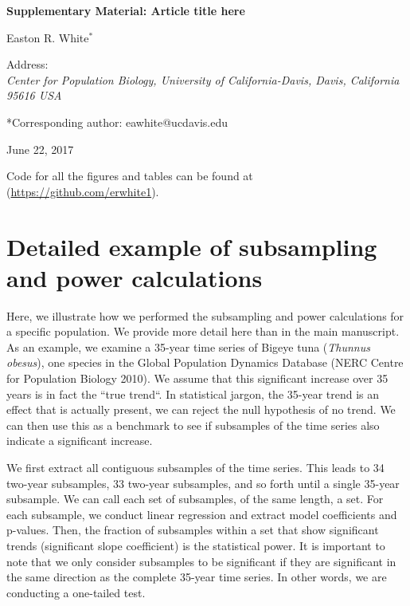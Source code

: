 \documentclass[12pt,]{article}
\title{}
\author{}
\date{}
\begin{document}
\vspace{2cm}

\begin{center}
 \textbf{Supplementary Material: Article title here}
 
Easton R. White$^{*}$
\vspace{3 mm}

Address: \\ \emph{Center for Population Biology, University of California-Davis, Davis, California 95616 USA}

*Corresponding author: eawhite@ucdavis.edu

June 22, 2017
 \end{center}

\vspace{2cm}

\tableofcontents

\vspace{1cm}

Code for all the figures and tables can be found at
(\url{https://github.com/erwhite1}).

\vspace{2cm}

\clearpage

\section{Detailed example of subsampling and power
calculations}\label{detailed-example-of-subsampling-and-power-calculations}

Here, we illustrate how we performed the subsampling and power
calculations for a specific population. We provide more detail here than
in the main manuscript. As an example, we examine a 35-year time series
of Bigeye tuna (\emph{Thunnus obesus}), one species in the Global
Population Dynamics Database (NERC Centre for Population Biology 2010).
We assume that this significant increase over 35 years is in fact the
``true trend``. In statistical jargon, the 35-year trend is an effect
that is actually present, we can reject the null hypothesis of no trend.
We can then use this as a benchmark to see if subsamples of the time
series also indicate a significant increase.

We first extract all contiguous subsamples of the time series. This
leads to 34 two-year subsamples, 33 two-year subsamples, and so forth
until a single 35-year subsample. We can call each set of subsamples, of
the same length, a set. For each subsample, we conduct linear regression
and extract model coefficients and p-values. Then, the fraction of
subsamples within a set that show significant trends (significant slope
coefficient) is the statistical power. It is important to note that we
only consider subsamples to be significant if they are significant in
the same direction as the complete 35-year time series. In other words,
we are conducting a one-tailed test.
\end{document}
